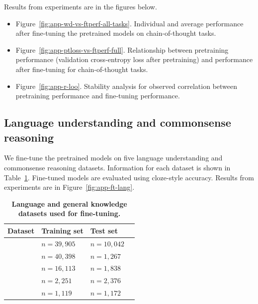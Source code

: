 \vspace{-0.5cm}
Results from experiments are in the figures below.
\vspace{-0.2cm}
\begin{itemize}[itemsep=1pt]
  \item Figure~\ref{fig:app-wd-vs-ftperf-all-tasks}. Individual and average performance after fine-tuning the pretrained models on chain-of-thought tasks.
  \item Figure~\ref{fig:app-ptloss-vs-ftperf-full}. Relationship between pretraining performance (validation cross-entropy loss after pretraining) and performance after fine-tuning for chain-of-thought tasks.
  \item Figure~\ref{fig:app-r-loo}. Stability analysis for observed correlation between pretraining performance and fine-tuning performance.
\end{itemize}




\subsection{Language understanding and commonsense reasoning}
\label{app:ft-lang}


We fine-tune the pretrained models on five language understanding and commonsense reasoning datasets. Information for each dataset is shown in Table~\ref{table:ft-datasets-lang}. Fine-tuned models are evaluated using cloze-style accuracy. Results from experiments are in Figure~\ref{fig:app-ft-lang}.

\renewcommand{\arraystretch}{1.2} 
\begin{table}[H]
\centering
\begin{tabular}{llll}
\hline
\textbf{Dataset}   & \textbf{Training set} & \textbf{Test set} \\ 
\hline
\hellaswag{}       & $n=39,905$    & $n=10,042$     \\
\winogrande{}      & $n=40,398$    & $n=1,267$      \\
\piqa{}            & $n=16,113$    & $n=1,838$      \\
\arceasy{}         & $n=2,251$    & $n=2,376$       \\
\arcchallenge{}    & $n=1,119$     & $n=1,172$      \\
\hline
\end{tabular}
\vspace{0.2cm}
\caption{\textbf{Language and general knowledge datasets used for fine-tuning.}}
\label{table:ft-datasets-lang}
\end{table}








